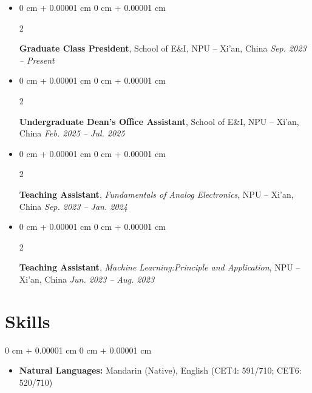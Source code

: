 \documentclass[10pt, letterpaper]{article}
\newenvironment{highlights}{
    \begin{itemize}[
        topsep=0.10 cm,
        parsep=0.10 cm,
        partopsep=0pt,
        itemsep=0pt,
        leftmargin=0 cm + 10pt
    ]
}{
    \end{itemize}
} %
\newenvironment{onecolentry}{
    \begin{adjustwidth}{
        0 cm + 0.00001 cm
    }{
        0 cm + 0.00001 cm
    }
}{
    \end{adjustwidth}
} %
\newenvironment{twocolentry}[2][]{
    \onecolentry
    \def\secondColumn{#2}
    \setcolumnwidth{\fill, 4.5 cm}
    \begin{paracol}{2}
}{
    \switchcolumn \raggedleft \secondColumn
    \end{paracol}
    \endonecolentry
} %
\begin{document}
        \begin{highlights}
        \item \begin{twocolentry}{
            \textit{Sep. 2023 – Present}
        }
            \textbf{Graduate Class President}, School of E\&I, NPU -- Xi'an, China\end{twocolentry}
        \end{highlights}
        
        \begin{highlights}
        \item \begin{twocolentry}{
            \textit{Feb. 2025 – Jul. 2025}
        }
            \textbf{Undergraduate Dean’s Office Assistant}, School of E\&I, NPU -- Xi'an, China\end{twocolentry}
        \end{highlights}

        \begin{highlights}
        \item \begin{twocolentry}{
            \textit{Sep. 2023 – Jan. 2024}
        }
            \textbf{Teaching Assistant}, \textit{Fundamentals of Analog Electronics}, NPU -- Xi'an, China\end{twocolentry}
        \end{highlights}
        
        \begin{highlights}
        	\item \begin{twocolentry}{
        			\textit{Jun. 2023 – Aug. 2023}
        		}
        		\textbf{Teaching Assistant}, \textit{Machine Learning:Principle and Application}, NPU -- Xi'an, China\end{twocolentry}
        \end{highlights}



    \section{Skills}

        \begin{onecolentry}
        \begin{highlights}
           \item \textbf{Natural Languages:} Mandarin (Native), English (CET4: 591/710; CET6: 520/710)
        \end{highlights}
        \end{onecolentry}
\end{document}

